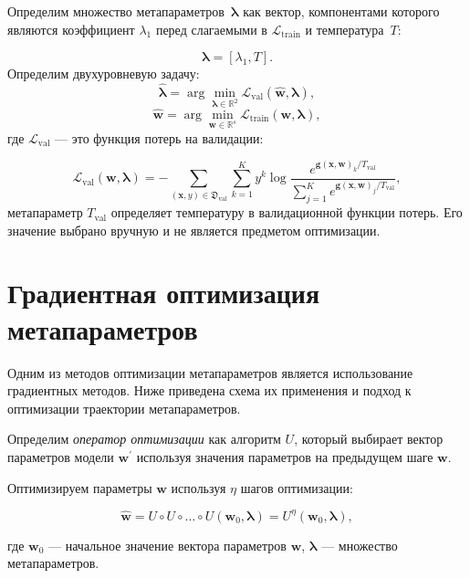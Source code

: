 \documentclass[12pt]{a&t}
\begin{document}
Определим множество метапараметров~$\boldsymbol{\lambda}$ как вектор, компонентами которого являются коэффициент $\lambda_1$ перед слагаемыми в $\mathcal{L}_\text{train}$ и температура~$T$:

\[\boldsymbol{\lambda} = [\lambda_1, T].\]
Определим двухуровневую задачу:
\begin{equation} \label{eq:opt_hyp}
    \hat{\boldsymbol{\lambda}} = \arg\min\limits_{\boldsymbol{\lambda} \in \mathbb{R}^2} \mathcal{L}_\text{val}(\hat{\mathbf{w}}, \boldsymbol{\lambda}),
\end{equation}
\begin{equation} \label{eq:opt_param}
    \hat{\mathbf{w}} = \arg\min\limits_{\mathbf{w} \in \mathbb{R}^s} \mathcal{L}_\text{train}(\mathbf{w}, \boldsymbol{\lambda}),
\end{equation}
где $\mathcal{L}_\text{val}$ --- это функция потерь на валидации:

$$
     \mathcal{L}_\text{val}(\mathbf{w}, \boldsymbol{\lambda}) = - \sum\limits_{(\mathbf{x}, y) \in \mathfrak{D}_\text{val}}\sum\limits_{k=1}^{K}y^k\log \frac{e^{\mathbf{g}(\mathbf{x}, \mathbf{w})_k/T_\text{val}}}{\sum\limits_{j=1}^Ke^{\mathbf{g}(\mathbf{x}, \mathbf{w})_j/T_\text{val}}},
$$
метапараметр $T_\text{val}$ определяет температуру в валидационной функции потерь. Его значение выбрано вручную и не является предметом оптимизации. 


\section{Градиентная оптимизация метапараметров}

Одним из методов оптимизации метапараметров является использование градиентных методов. Ниже приведена схема их применения и подход к оптимизации траектории метапараметров.

\begin{definition} 
Определим \textit{оператор оптимизации} как алгоритм $U$, который выбирает вектор параметров модели $\mathbf{w}^\prime$ используя значения параметров на предыдущем шаге $\mathbf{w}$.
\end{definition}

Оптимизируем параметры $\mathbf{w}$ используя $\eta$ шагов оптимизации:

$$
    \hat{\mathbf{w}} = U \circ U \circ \dots \circ U(\mathbf{w}_0, \boldsymbol{\lambda}) = U^\eta(\mathbf{w}_0, \boldsymbol{\lambda}),
$$

\noindent
где $\mathbf{w}_0$ --- начальное значение вектора параметров $\mathbf{w}$, $\boldsymbol{\lambda}$ --- множество метапараметров.
\end{document}

